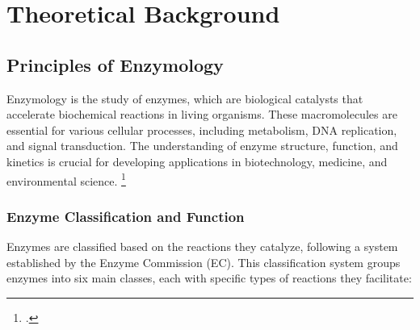 \section{Theoretical Background}

\subsection{Principles of Enzymology}
\label{sec:Principles of Enzymology}

Enzymology is the study of enzymes, which are biological catalysts that accelerate biochemical reactions in living organisms. These macromolecules are essential for various cellular processes, including metabolism, DNA replication, and signal transduction. The understanding of enzyme structure, function, and kinetics is crucial for developing applications in biotechnology, medicine, and environmental science. \footcite{robinsonEnzymesPrinciplesBiotechnological2015}

\subsubsection{Enzyme Classification and Function}
\label{sec:Enzyme Classification and Function}

Enzymes are classified based on the reactions they catalyze, following a system established by the Enzyme Commission (EC). This classification system groups enzymes into six main classes, each with specific types of reactions they facilitate:

